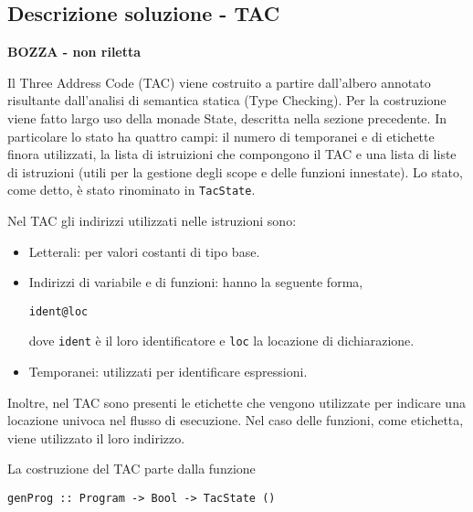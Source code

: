 \subsection{Descrizione soluzione - TAC}
\begin{center}
    {\bf BOZZA - non riletta}
\end{center}
Il Three Address Code (TAC) viene costruito a partire dall'albero annotato risultante dall'analisi di semantica statica (Type Checking). Per la costruzione viene fatto largo uso della monade State, descritta nella sezione precedente. In particolare lo stato ha quattro campi: il numero di temporanei e di etichette finora utilizzati, la lista di istruizioni che compongono il TAC e una lista di liste di istruzioni (utili per la gestione degli scope e delle funzioni innestate). Lo stato, come detto, è stato rinominato in {\tt TacState}.

Nel TAC gli indirizzi utilizzati nelle istruzioni sono:
\begin{itemize}
    \item Letterali: per valori costanti di tipo base.
    \item Indirizzi di variabile e di funzioni: hanno la seguente forma,
    \begin{center}
        {\tt ident@loc}
    \end{center}
    dove {\tt ident} è il loro identificatore e {\tt loc} la locazione di dichiarazione.
    \item Temporanei: utilizzati per identificare espressioni.
\end{itemize}
Inoltre, nel TAC sono presenti le etichette che vengono utilizzate per indicare una locazione univoca nel flusso di esecuzione. Nel caso delle funzioni, come etichetta, viene utilizzato il loro indirizzo.

La costruzione del TAC parte dalla funzione 
\begin{center}
    {\tt genProg :: Program -> Bool -> TacState ()} 
\end{center}


